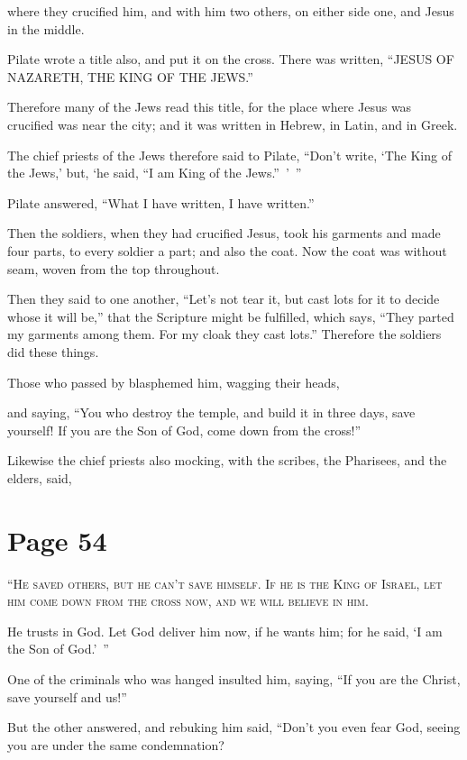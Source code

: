 where they crucified him, and with him two others, on either side one, and Jesus in the middle.

Pilate wrote a title also, and put it on the cross. There was written, “JESUS OF NAZARETH, THE KING OF THE JEWS.”

Therefore many of the Jews read this title, for the place where Jesus was crucified was near the city; and it was written in Hebrew, in Latin, and in Greek.

The chief priests of the Jews therefore said to Pilate, “Don’t write, ‘The King of the Jews,’ but, ‘he said, “I am King of the Jews.” ’ ”

Pilate answered, “What I have written, I have written.”

Then the soldiers, when they had crucified Jesus, took his garments and made four parts, to every soldier a part; and also the coat. Now the coat was without seam, woven from the top throughout.

Then they said to one another, “Let’s not tear it, but cast lots for it to decide whose it will be,” that the Scripture might be fulfilled, which says, “They parted my garments among them. For my cloak they cast lots.” Therefore the soldiers did these things.

Those who passed by blasphemed him, wagging their heads,

and saying, “You who destroy the temple, and build it in three days, save yourself! If you are the Son of God, come down from the cross!”

Likewise the chief priests also mocking, with the scribes, the Pharisees, and the elders, said,



\chapterornament
\section*{Page 54}

\lettrine{“}{He saved others, but he can’t save himself. If he is the King of Israel, let him come down from the cross now, and we will believe in him.}

He trusts in God. Let God deliver him now, if he wants him; for he said, ‘I am the Son of God.’ ”

One of the criminals who was hanged insulted him, saying, “If you are the Christ, save yourself and us!”

But the other answered, and rebuking him said, “Don’t you even fear God, seeing you are under the same condemnation?

